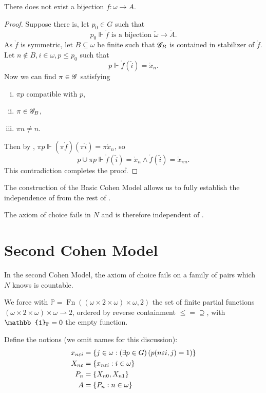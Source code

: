 \begin{lemma}
    There does not exist a bijection \(f:\omega\to A\).
\end{lemma}
\begin{proof}
Suppose there is, let \(p_0 \in G\) such that \[p_0\Vdash \mathring{f} \text{ is a bijection } \check{\omega}\to\mathring{A}. \]
As \(\mathring{f}\) is symmetric, let \(B\subseteq \omega\) be finite such that \(\mathscr{G}_B\) is contained in stabilizer of \(\mathring{f}\).
Let \(n\notin B, i\in\omega, p\leq p_0\) such that \[p\Vdash \mathring{f}(\check{i}) = \mathring{x}_n.\]
Now we can find \(\pi\in\mathscr{G}\) satisfying
\begin{enumerate}[i.]
    \item \(\pi p\) compatible with \(p\),
    \item \(\pi \in \mathscr{G}_B\),
    \item \(\pi n\ne n\).
\end{enumerate}
Then by , \(\pi p \Vdash (\pi \mathring{f})(\pi \check{i}) = \pi \mathring{x}_{n}\), so
\[p \cup \pi p \Vdash \mathring{f}(\check{i}) = \mathring{x}_n \land \mathring{f}(\check{i}) = \mathring{x}_{\pi n}. \]
This contradiction completes the proof.
\end{proof}

The construction of the Basic Cohen Model allows us to fully establish the independence of  from the rest of \ZF.
\begin{theorem}
    The axiom of choice fails in \(N\) and is therefore independent of \ZF.
\end{theorem}




\section{Second Cohen Model}

In the second Cohen Model, the axiom of choice fails on a family of pairs which \(N\) knows is countable.


We force with \(\mathbb{P} = \operatorname{Fn}((\omega\times 2 \times\omega)\times\omega, 2)\)
the set of finite partial functions \((\omega\times 2 \times\omega)\times\omega \rightharpoonup 2\),
ordered by reverse containment \(\leq = \supseteq\),
with \(\mathbb{1}_\P = 0\) the empty function.

Define the notions (we omit names for this discussion):
\begin{align*}
    x_{n\varepsilon i} &= {\left\{ j\in\omega: \left(\exists p\in G\right) \left(p(n\varepsilon i, j) = 1\right)  \right\}}\\
    X_{n\varepsilon} &= {\left\{ x_{n\varepsilon i}: i\in\omega \right\}}\\
    P_n &= {\left\{ X_{n0}, X_{n1} \right\}}\\
    A &= {\left\{ P_n:n\in\omega \right\}}
\end{align*}

